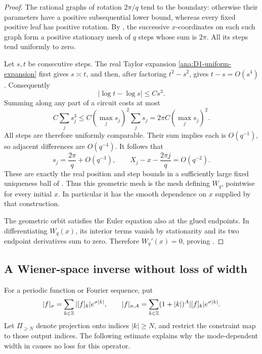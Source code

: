 \begin{proof}
The rational graphs of rotation \(2\pi/q\) tend to the boundary:
otherwise their parameters have a positive subsequential lower bound,
whereas every fixed positive leaf has positive rotation.
By , the successive \(x\)-coordinates
on each such graph form a positive stationary mesh of \(q\) steps
whose sum is \(2\pi\).  All its steps tend uniformly to zero.

Let \(s,t\) be consecutive steps.  The real Taylor expansion
\eqref{ana:D1-uniform-expansion} first gives \(s\asymp t\), and then,
after factoring \(t^2-s^2\), gives \(t-s=O(s^4)\).
Consequently
\[
|\log t-\log s|\le Cs^3.
\]
Summing along any part of a circuit costs at most
\[
C\sum_j s_j^3\le C(\max_j s_j)^2\sum_j s_j
=2\pi C(\max_j s_j)^2.
\]
All steps are therefore uniformly comparable.  Their sum implies
each is \(O(q^{-1})\), so adjacent differences are \(O(q^{-4})\).
It follows that
\[
s_j=\frac{2\pi}{q}+O(q^{-3}),\qquad
X_j-x-\frac{2\pi j}{q}=O(q^{-2}).
\]
These are exactly the real position and step bounds in a sufficiently
large fixed uniqueness ball of .
Thus this geometric mesh is the mesh defining \(W_q\), pointwise
for every initial \(x\).  In particular it has the smooth dependence
on \(x\) supplied by that construction.

The geometric orbit satisfies the Euler equation also at the glued
endpoints.  In differentiating \(W_q(x)\), its interior terms vanish
by stationarity and its two endpoint derivatives sum to zero.
Therefore \(W_q'(x)=0\), proving .
\end{proof}

\subsection{A Wiener-space inverse without loss of width}

For a periodic function or Fourier sequence, put
\[
|f|_\sigma=\sum_{k\in\mathbb Z}|[f]_k|e^{\sigma|k|},
\qquad
|f|_{\sigma,A}=\sum_{k\in\mathbb Z}(1+|k|)^A|[f]_k|e^{\sigma|k|}.
\]
Let \(\Pi_{\ge N}\) denote projection onto indices \(|k|\ge N\),
and restrict the constraint map to those output indices.
The following estimate explains why the mode-dependent width in
 causes no loss for this operator.

